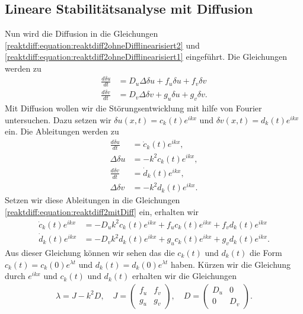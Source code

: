 \subsection{Lineare Stabilitätsanalyse mit Diffusion
\label{reaktdiff:section:matheDiff}}
Nun wird die Diffusion in die Gleichungen \ref{reaktdiff:equation:reaktdiff2ohneDifflinearisiert2} und \ref{reaktdiff:equation:reaktdiff2ohneDifflinearisiert1} eingeführt.
Die Gleichungen werden zu
\begin{align}
    \label{reaktdiff:equation:reaktdiff2mitDiff}
    \frac{d \delta u}{dt} &= D_u \Delta \delta u + 
    f_u \delta u + f_v \delta v\\
    \frac{d \delta v}{dt} &= D_v \Delta \delta v + 
    g_u \delta u + g_v \delta v.
\end{align}
Mit Diffusion wollen wir die Störungsentwicklung mit hilfe von Fourier untersuchen.
Dazu setzen wir \(\delta u(x,t) = c_k(t) e^{ikx}\) und \(\delta v(x,t) = d_k(t) e^{ikx}\) ein.
Die Ableitungen werden zu
\begin{align*}
    \frac{d\delta u}{d t} &= \dot{c}_k(t) e^{ikx},\\
    \Delta \delta u &= -k^2 c_k(t) e^{ikx},\\
    \frac{d\delta v}{d t} &= \dot{d}_k(t) e^{ikx},\\
    \Delta \delta v &= -k^2 d_k(t) e^{ikx}.
\end{align*}
Setzen wir diese Ableitungen in die Gleichungen \ref{reaktdiff:equation:reaktdiff2mitDiff} ein, erhalten wir
\begin{align}
    \label{reaktdiff:equation:reaktdiff2mitDiffFourier}
    \dot{c}_k(t) e^{ikx} &= -D_u k^2 c_k(t) e^{ikx} + 
    f_u c_k(t) e^{ikx} + f_v d_k(t) e^{ikx}\\
    \dot{d}_k(t) e^{ikx} &= -D_v k^2 d_k(t) e^{ikx} + 
    g_u c_k(t) e^{ikx} + g_v d_k(t) e^{ikx}.
\end{align}
Aus dieser Gleichung können wir sehen das die \(c_k(t)\) und \(d_k(t)\) die Form \(c_k(t) = c_k(0) e^{\lambda t}\) und \(d_k(t) = d_k(0) e^{\lambda t}\) haben.
Kürzen wir die Gleichung durch \(e^{ikx}\) und \(c_k(t)\) und \(d_k(t)\) erhalten wir die Gleichungen
\begin{align}
    \label{reaktdiff:equation:reaktdiff2mitDiffFourierk}
    \lambda = J - k^2 D, \quad 
    J =
    \begin{pmatrix}
        f_u & f_v\\
        g_u & g_v
    \end{pmatrix}, \quad
    D =
    \begin{pmatrix}
        D_u & 0\\
        0 & D_v
    \end{pmatrix}.
\end{align}
